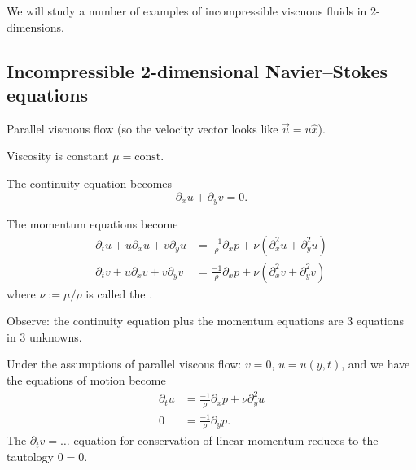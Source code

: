 
\lecture{}

\begin{node}
We will study a number of examples of incompressible viscuous fluids
in 2-dimensions.
\end{node}

\subsection{Incompressible 2-dimensional Navier--Stokes equations}

\begin{assume}
Parallel viscuous flow (so the velocity vector looks like $\vec{u}=u\widehat{x}$).
\end{assume}

\begin{assume}
Viscosity is constant $\mu=\mbox{const.}$
\end{assume}

\begin{node}
The continuity equation becomes
\begin{equation}
\partial_{x}u+\partial_{y}v=0.
\end{equation}
\end{node}

\begin{node}
The momentum equations become
\begin{subequations}
  \begin{align}
\partial_{t}u+u\partial_{x}u+v\partial_{y}u &= \frac{-1}{\rho}\partial_{x}p+\nu(\partial_{x}^{2}u+\partial_{y}^{2}u)\\
\partial_{t}v+u\partial_{x}v+v\partial_{y}v &= \frac{-1}{\rho}\partial_{x}p+\nu(\partial_{x}^{2}v+\partial_{y}^{2}v)
  \end{align}
\end{subequations}
where $\nu := \mu/\rho$ is called the .

Observe: the continuity equation plus the momentum equations are 3
equations in 3 unknowns.
\end{node}

\begin{node}
Under the assumptions of parallel viscous flow: $v=0$, $u=u(y,t)$, and
we have the equations of motion become
\begin{subequations}
  \begin{align}
\partial_{t}u &= \frac{-1}{\rho}\partial_{x}p+\nu\partial_{y}^{2}u\\
0 &=\frac{-1}{\rho}\partial_{y}p.
  \end{align}
\end{subequations}
The $\partial_{t}v=\dots$ equation for conservation of linear momentum
reduces to the tautology $0=0$.
\end{node}


